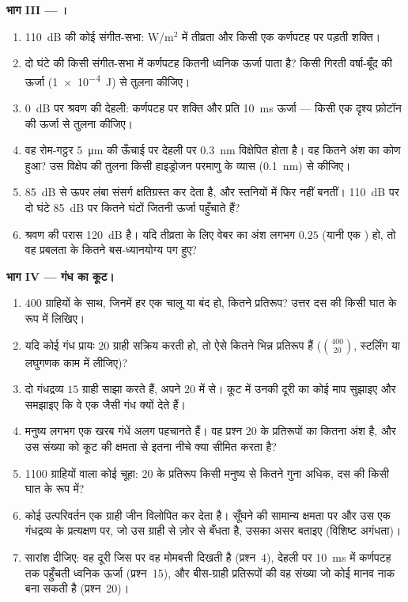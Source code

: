 \begin{problem}
\medskip
\noindent\textbf{भाग III --- ।}
\begin{enumerate}[resume]
  \item \qty{110}{dB} की कोई संगीत-सभा: W/m$^{2}$ में तीव्रता और किसी
        एक कर्णपटह पर पड़ती शक्ति।
  \item दो घंटे की किसी संगीत-सभा में कर्णपटह कितनी ध्वनिक ऊर्जा पाता
        है? किसी गिरती वर्षा-बूँद की ऊर्जा (\qty{1e-4}{J}) से तुलना
        कीजिए।
  \item \qty{0}{dB} पर श्रवण की देहली: कर्णपटह पर शक्ति और प्रति
        \qty{10}{ms} ऊर्जा --- किसी एक दृश्य फ़ोटॉन की ऊर्जा से तुलना
        कीजिए।
  \item वह रोम-गट्ठर \qty{5}{\micro m} की ऊँचाई पर देहली पर
        \qty{0.3}{nm} विक्षेपित होता है। वह कितने अंश का कोण हुआ? उस
        विक्षेप की तुलना किसी हाइड्रोजन परमाणु के व्यास
        (\qty{0.1}{nm}) से कीजिए।
  \item \qty{85}{dB} से ऊपर लंबा संसर्ग  क्षतिग्रस्त कर
        देता है, और स्तनियों में  फिर नहीं बनतीं।
        \qty{110}{dB} पर दो घंटे \qty{85}{dB} पर कितने घंटों जितनी
        ऊर्जा पहुँचाते हैं?
  \item श्रवण की परास \qty{120}{dB} है। यदि तीव्रता के लिए वेबर का अंश
        लगभग $0.25$ (यानी एक ) हो, तो वह प्रबलता के कितने
        बस-ध्यानयोग्य पग हुए?
\end{enumerate}

\medskip
\noindent\textbf{भाग IV --- गंध का कूट।}
\begin{enumerate}[resume]
  \item $400$ ग्राहियों के साथ, जिनमें हर एक चालू या बंद हो, कितने
        प्रतिरूप? उत्तर दस की किसी घात के रूप में लिखिए।
  \item यदि कोई गंध प्रायः $20$ ग्राही सक्रिय करती हो, तो ऐसे कितने
        भिन्न प्रतिरूप हैं ($\binom{400}{20}$, स्टर्लिंग या लघुगणक काम
        में लीजिए)?
  \item दो गंधद्रव्य $15$ ग्राही साझा करते हैं, अपने $20$ में से। कूट
        में उनकी दूरी का कोई माप सुझाइए और समझाइए कि वे एक जैसी गंध
        क्यों देते हैं।
  \item मनुष्य लगभग एक खरब गंधें अलग पहचानते हैं। वह प्रश्न 20 के
        प्रतिरूपों का कितना अंश है, और उस संख्या को कूट की क्षमता से
        इतना नीचे क्या सीमित करता है?
  \item \num{1100} ग्राहियों वाला कोई चूहा: $20$ के प्रतिरूप किसी
        मनुष्य से कितने गुना अधिक, दस की किसी घात के रूप में?
  \item कोई उत्परिवर्तन एक ग्राही जीन विलोपित कर देता है। सूँघने की
        सामान्य क्षमता पर और उस एक गंधद्रव्य के प्रत्यक्षण पर, जो उस
        ग्राही से ज़ोर से बँधता है, उसका असर बताइए (विशिष्ट अगंधता)।
  \item सारांश दीजिए: वह दूरी जिस पर वह मोमबत्ती दिखती है (प्रश्न~4),
        देहली पर \qty{10}{ms} में कर्णपटह तक पहुँचती ध्वनिक ऊर्जा
        (प्रश्न~15), और बीस-ग्राही प्रतिरूपों की वह संख्या जो कोई मानव
        नाक बना सकती है (प्रश्न~20)।
\end{enumerate}
\end{problem}
